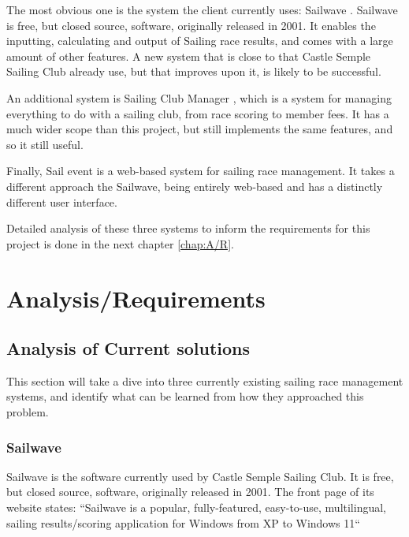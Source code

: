 \documentclass{l4proj}
\begin{document}
The most obvious one is the system the client currently uses: Sailwave \citet{sailwave}. Sailwave is free, but closed source, software, originally released in 2001. It enables the inputting, calculating and output of Sailing race results, and comes with a large amount of other features. A new system that is close to that Castle Semple Sailing Club already use, but that improves upon it, is likely to be successful. 

An additional system is Sailing Club Manager \citet{ClubManager}, which is a system for managing everything to do with a sailing club, from race scoring to member fees. It has a much wider scope than this project, but still implements the same features, and so it still useful.

Finally, Sail event \citet{SailEvent} is a web-based system for sailing race management. It takes a different approach the Sailwave, being entirely web-based and has a distinctly different user interface.

Detailed analysis of these three systems to inform the requirements for this project is done in the next chapter \autoref{chap:A/R}.




\chapter{Analysis/Requirements}\label{chap:A/R}
\section{Analysis of Current solutions}
This section will take a dive into three currently existing sailing race management systems, and identify what can be learned from how they approached this problem.
\subsection{Sailwave}
Sailwave \citet{sailwave} is the software currently used by Castle Semple Sailing Club. It is free, but closed source, software, originally released in 2001.
The front page of its website \citep{sailwave} states: “Sailwave is a popular, fully-featured, easy-to-use, multilingual, sailing results/scoring application for Windows from XP to Windows 11“
\end{document}
